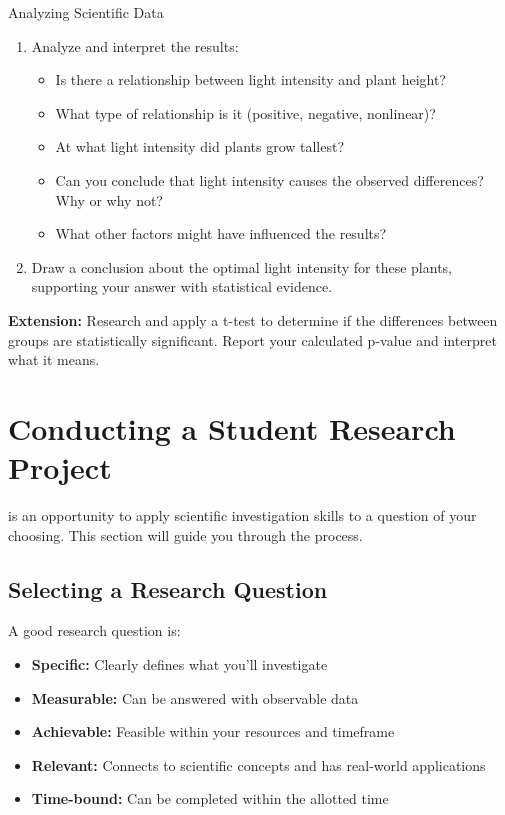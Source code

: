\begin{investigation}{Analyzing Scientific Data}
\begin{enumerate}
    \item Analyze and interpret the results:
    \begin{itemize}
        \item Is there a relationship between light intensity and plant height?
        \item What type of relationship is it (positive, negative, nonlinear)?
        \item At what light intensity did plants grow tallest?
        \item Can you conclude that light intensity causes the observed differences? Why or why not?
        \item What other factors might have influenced the results?
    \end{itemize}
    
    \item Draw a conclusion about the optimal light intensity for these plants, supporting your answer with statistical evidence.
\end{enumerate}

\textbf{Extension:} Research and apply a t-test to determine if the differences between groups are statistically significant. Report your calculated p-value and interpret what it means.
\end{investigation}


\section{Conducting a Student Research Project}

 is an opportunity to apply scientific investigation skills to a question of your choosing. This section will guide you through the process.

\subsection{Selecting a Research Question}

A good research question is:
\begin{itemize}
    \item \textbf{Specific:} Clearly defines what you'll investigate
    \item \textbf{Measurable:} Can be answered with observable data
    \item \textbf{Achievable:} Feasible within your resources and timeframe
    \item \textbf{Relevant:} Connects to scientific concepts and has real-world applications
    \item \textbf{Time-bound:} Can be completed within the allotted time
\end{itemize}

